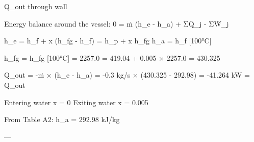 Q_out through wall  

Energy balance around the vessel:  
0 = ṁ (h_e - h_a) + ΣQ̇_j - ΣẆ_j  

h_e = h_f + x (h_fg - h_f) = h_p + x h_fg  
h_a = h_f [100°C]  

h_fg = h_fg [100°C] = 2257.0  
= 419.04 + 0.005 × 2257.0 = 430.325  

Q_out = -ṁ × (h_e - h_a) = -0.3 kg/s × (430.325 - 292.98) = -41.264 kW = Q_out  

Entering water x = 0  
Exiting water x = 0.005  

From Table A2:  
h_a = 292.98 kJ/kg  

---